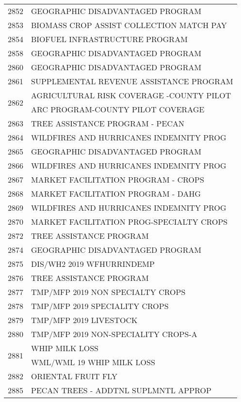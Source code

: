 \begin{longtable}{ll}
\cline{1-2}
2852 & GEOGRAPHIC DISADVANTAGED PROGRAM \\
\cline{1-2}
2853 & BIOMASS CROP ASSIST COLLECTION MATCH PAY \\
\cline{1-2}
2854 & BIOFUEL INFRASTRUCTURE PROGRAM \\
\cline{1-2}
2858 & GEOGRAPHIC DISADVANTAGED PROGRAM \\
\cline{1-2}
2860 & GEOGRAPHIC DISADVANTAGED PROGRAM \\
\cline{1-2}
2861 & SUPPLEMENTAL REVENUE ASSISTANCE PROGRAM \\
\cline{1-2}
\multirow[t]{2}{*}{2862} & AGRICULTURAL RISK COVERAGE -COUNTY PILOT \\
 & ARC PROGRAM-COUNTY PILOT COVERAGE \\
\cline{1-2}
2863 & TREE ASSISTANCE PROGRAM - PECAN \\
\cline{1-2}
2864 & WILDFIRES AND HURRICANES INDEMNITY PROG \\
\cline{1-2}
2865 & GEOGRAPHIC DISADVANTAGED PROGRAM \\
\cline{1-2}
2866 & WILDFIRES AND HURRICANES INDEMNITY PROG \\
\cline{1-2}
2867 & MARKET FACILITATION PROGRAM - CROPS \\
\cline{1-2}
2868 & MARKET FACILITATION PROGRAM - DAHG \\
\cline{1-2}
2869 & WILDFIRES AND HURRICANES INDEMNITY PROG \\
\cline{1-2}
2870 & MARKET FACILITATION PROG-SPECIALTY CROPS \\
\cline{1-2}
2872 & TREE ASSISTANCE PROGRAM \\
\cline{1-2}
2874 & GEOGRAPHIC DISADVANTAGED PROGRAM \\
\cline{1-2}
2875 & DIS/WH2 2019 WFHURRINDEMP \\
\cline{1-2}
2876 & TREE ASSISTANCE PROGRAM \\
\cline{1-2}
2877 & TMP/MFP 2019 NON SPECIALTY CROPS \\
\cline{1-2}
2878 & TMP/MFP 2019 SPECIALITY CROPS \\
\cline{1-2}
2879 & TMP/MFP 2019 LIVESTOCK \\
\cline{1-2}
2880 & TMP/MFP 2019 NON-SPECIALITY CROPS-A \\
\cline{1-2}
\multirow[t]{2}{*}{2881} & WHIP MILK LOSS \\
 & WML/WML 19 WHIP MILK LOSS \\
\cline{1-2}
2882 & ORIENTAL FRUIT FLY \\
\cline{1-2}
2885 & PECAN TREES - ADDTNL SUPLMNTL APPROP \\

\end{longtable}
